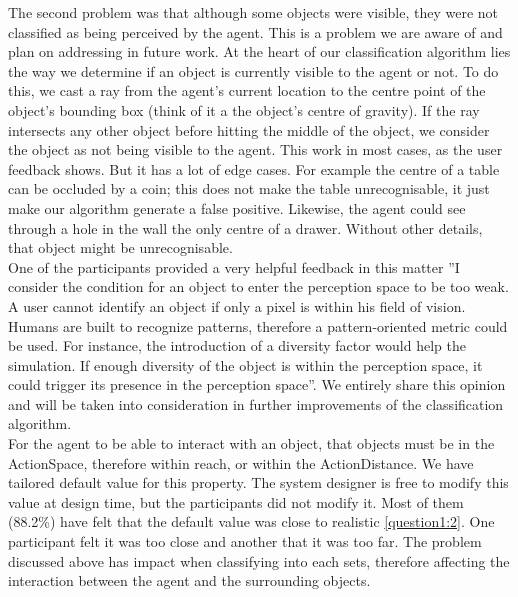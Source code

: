 The second problem was that although some objects were visible, they were not classified as being perceived by the agent. This is a problem we are aware of and plan on addressing in future work. At the heart of our classification algorithm lies the way we determine if an object is currently visible to the agent or not. To do this, we cast a ray from the agent's current location to the centre point of the object's bounding box (think of it a the object's centre of gravity). If the ray intersects any other object before hitting the middle of the object, we consider the object as not being visible to the agent. This work in most cases, as the user feedback shows. But it has a lot of edge cases. For example the centre of a table can be occluded by a coin; this does not make the table unrecognisable, it just make our algorithm generate a false positive. Likewise, the agent could see through a hole in the wall the only centre of a drawer. Without other details, that object might be unrecognisable.\\

One of the participants provided a very helpful feedback in this matter ''I consider the condition for an object to enter the perception space to be too weak. A user cannot identify an object if only a pixel is within his field of vision. Humans are built to recognize patterns, therefore a pattern-oriented metric could be used. For instance, the introduction of a diversity factor would help the simulation. If enough diversity of the object is within the perception space, it could trigger its presence in the perception space''. We entirely share this opinion and will be taken into consideration in further improvements of the classification algorithm.\\

For the agent to be able to interact with an object, that objects must be in the ActionSpace, therefore within reach, or within the ActionDistance. We have tailored default value for this property. The system designer is free to modify this value at design time, but the participants did not modify it. Most of them (88.2\%) have felt that the default value was close to realistic \ref{question1:2}. One participant felt it was too close and another that it was too far. The problem discussed above has impact when classifying into each sets, therefore affecting the interaction between the agent and the surrounding objects.\\

